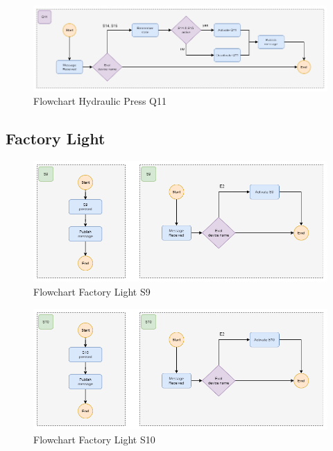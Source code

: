 \begin{figure}[H]
    \centering
    \includegraphics[width=1.0\textwidth]{images/flowchart_factory_press_q11.png}
    \caption{Flowchart Hydraulic Press Q11}
    \label{fig:FlowChartFactoryPressQ11}
\end{figure}

\subsection*{Factory Light}

\begin{figure}[H]
    \centering
    \includegraphics[width=1.0\textwidth]{images/flowchart_factory_light_s9.png}
    \caption{Flowchart Factory Light S9}
    \label{fig:FlowChartFactoryLightS9}
\end{figure}

\begin{figure}[H]
    \centering
    \includegraphics[width=1.0\textwidth]{images/flowchart_factory_light_s10.png}
    \caption{Flowchart Factory Light S10}
    \label{fig:FlowChartFactoryLightS10}
\end{figure}

